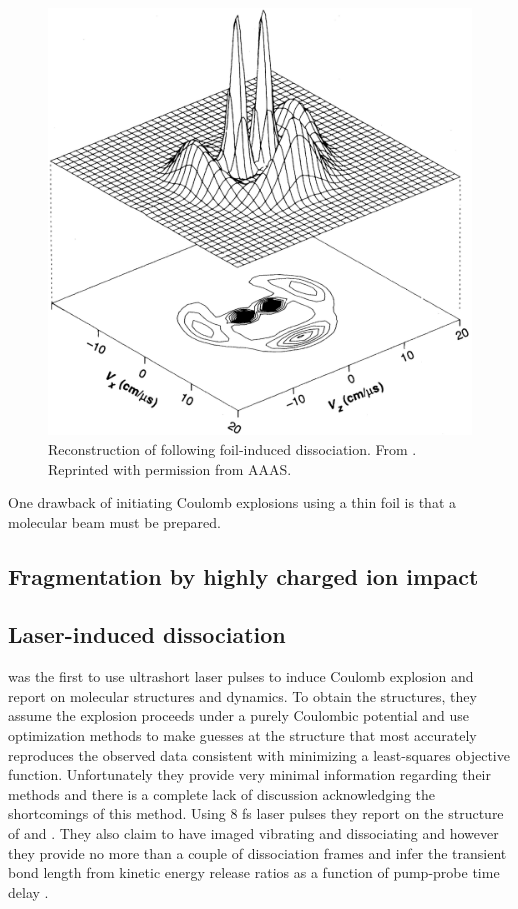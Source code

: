 \begin{figure}
  \centering
  \includegraphics[width=\textwidth]{gfx/VagerPseudoGeometry}
  \caption[Reconstruction of  following foil-induced dissociation.]
  {Reconstruction of  following foil-induced dissociation. From \citet{Vager89}. Reprinted with permission from AAAS.}
\end{figure}

One drawback of initiating Coulomb explosions using a thin foil is that a molecular beam must be prepared.

\subsection{Fragmentation by highly charged ion impact}

\subsection{Laser-induced dissociation}
\citet{Legare05structure,Legare05dynamics} was the first to use ultrashort laser pulses to induce Coulomb explosion and report on molecular structures and dynamics. To obtain the structures, they assume the explosion proceeds under a purely Coulombic potential and use optimization methods to make guesses at the structure that most accurately reproduces the observed data consistent with minimizing a least-squares objective function. Unfortunately they provide very minimal information regarding their methods and there is a complete lack of discussion acknowledging the shortcomings of this method\footnotemark. Using 8 fs laser pulses they report on the structure of  and  \citep{Legare05structure}. They also claim to have imaged vibrating  and dissociating  and  however they provide no more than a couple of dissociation frames and infer the transient  bond length from kinetic energy release ratios as a function of pump-probe time delay \citep{Legare05dynamics}.

